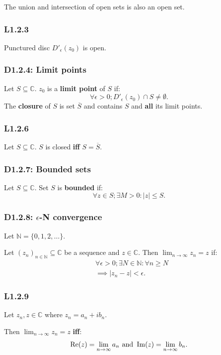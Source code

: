 \documentclass{article}
\begin{document}
\begin{multicols*}{3}
The union and intersection of open sets is
also an open set.

\subsubsection*{L1.2.3}
Punctured disc $D'_{\epsilon}(z_0)$ is open.

\subsubsection*{D1.2.4: Limit points}
Let $S\subseteq\mathbb{C}$. $z_0$ is a \textbf{limit point} of $S$ if:
$$\forall\epsilon>0; D'_{\epsilon}(z_0)\cap S\neq\emptyset.$$
The \textbf{closure} of $S$ is set $\overline{S}$ and contains $S$
and \textbf{all} its limit points.

\subsubsection*{L1.2.6}
Let $S\subseteq\mathbb{C}$.
$S$ is closed \textbf{if{}f} $S=\overline{S}$.

\subsubsection*{D1.2.7: Bounded sets}
Let $S\subseteq\mathbb{C}$. Set $S$ is \textbf{bounded} if:
$$\forall z\in S;\exists M>0:|z|\leq S.$$

\subsubsection*{D1.2.8: $\epsilon$-N convergence}
Let $\mathbb{N}=\{0,1,2,\dots\}$.

Let $(z_n)_{n\in\mathbb{N}}\subseteq\mathbb{C}$ be a sequence
and $z\in\mathbb{C}$.
Then $\displaystyle\lim_{n\rightarrow\infty}z_n=z$ if:
\begin{align*}
    &\forall\epsilon>0;\exists N\in\mathbb{N}:\forall n\geq N \\
    &\implies |z_n-z|<\epsilon.
\end{align*}

\subsubsection*{L1.2.9}
Let $z_n,z\in\mathbb{C}$ where $z_n=a_n+i b_n$.

Then $\displaystyle\lim_{n\rightarrow\infty}z_n=z$ \textbf{if{}f}:
$$\Re(z)=\lim_{n\rightarrow\infty}a_n
\hspace{0.05in}\text{and}\hspace{0.05in}
\Im(z)=\lim_{n\rightarrow\infty}b_n.$$


\end{multicols*}
\end{document}
